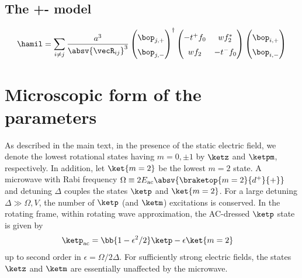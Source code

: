 \subsection{The +- model}
\begin{align}
    \hamil = \sum_{i\ne j} \frac{a^3}{\absv{\vecR_{ij}}^3}
    \begin{pmatrix}
        \bop_{j,+} \\
        \bop_{j,-}
    \end{pmatrix}^{\dag}
    \begingroup
        \renewcommand*{\arraystretch}{1.5}
        \begin{pmatrix}
            -t^+ f_0 & w f_2^* \\
            w f_2 & -t^- f_0 \\
        \end{pmatrix}
    \endgroup
    \begin{pmatrix}
        \bop_{i,+} \\
        \bop_{i,-}
    \end{pmatrix}^{\vphantom\dag}
\end{align}



\section{Microscopic form of the parameters}
As described in the main text, in the presence of the static electric field, we denote the lowest rotational states having $m=0, \pm 1$ by $\ketz$ and $\ketpm$, respectively.
In addition, let $\ket{m=2}$ be the lowest $m=2$ state.
A microwave with Rabi frequency $\Omega \equiv 2 E_\text{ac} \absv{\braketop{m=2}{d^+}{{+}}}$ and detuning $\Delta$ couples the states $\ketp$ and $\ket{m=2}$.
For a large detuning $\Delta \gg \Omega, V$, the number of $\ketp$ (and $\ketm$) excitations is conserved.
In the rotating frame, within rotating wave approximation, the AC-dressed $\ketp$ state is given by
\begin{align}
    \ketp_\text{ac} &= \bb{1-\epsilon^2/2}\ketp - \epsilon \ket{m=2}
\end{align}
up to second order in $\epsilon=\Omega/2\Delta$.
For sufficiently strong electric fields, the states $\ketz$ and $\ketm$ are essentially unaffected by the microwave.

